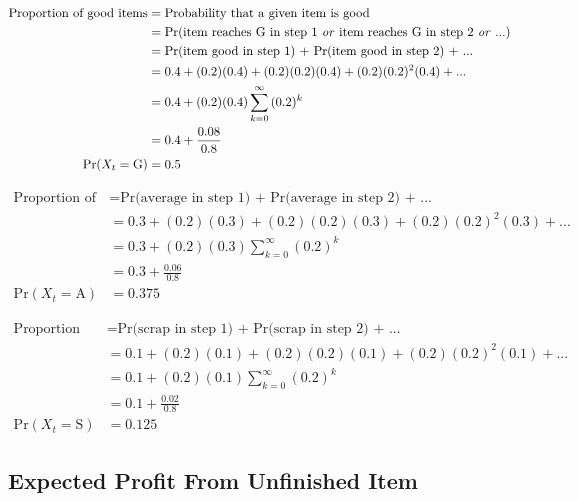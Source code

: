 \documentclass[12pt]{article}
\begin{document}
\begin{align*}
	\text{Proportion of good items} & = \text{Probability that a given item is good} \\
	& = \text{Pr(item reaches G in step 1 \textit{or} item reaches G in step 2 \textit{or} ...)} \\
	& = \text{Pr(item good in step 1) + Pr(item good in step 2) + ...}\\
	& = 0.4 + (0.2)(0.4) + (0.2)(0.2)(0.4) + (0.2)(0.2)^2(0.4) + ... \\
	& = 0.4 + (0.2)(0.4)\sum_{k=0}^{\infty}{(0.2)^k}\\
	& = 0.4 + \frac{0.08}{0.8}\\
	\text{Pr}(X_t = \text{G})& = 0.5
\end{align*}

\begin{align*}
	\text{Proportion of average items} & = \text{Pr(average in step 1) + Pr(average in step 2) + ...}\\
	& = 0.3 + (0.2)(0.3) + (0.2)(0.2)(0.3) + (0.2)(0.2)^2(0.3) + ... \\
	& = 0.3 + (0.2)(0.3)\sum_{k=0}^{\infty}{(0.2)^k}\\
	& = 0.3 + \frac{0.06}{0.8}\\
	\text{Pr}(X_t = \text{A})& = 0.375
\end{align*}

\begin{align*}
	\text{Proportion of scrapped items} & = \text{Pr(scrap in step 1) + Pr(scrap in step 2) + ...}\\
	& = 0.1 + (0.2)(0.1) + (0.2)(0.2)(0.1) + (0.2)(0.2)^2(0.1) + ... \\
	& = 0.1 + (0.2)(0.1)\sum_{k=0}^{\infty}{(0.2)^k}\\
	& = 0.1 + \frac{0.02}{0.8}\\
	\text{Pr}(X_t = \text{S})& = 0.125
\end{align*}

\subsection{Expected Profit From Unfinished Item}
\end{document}
